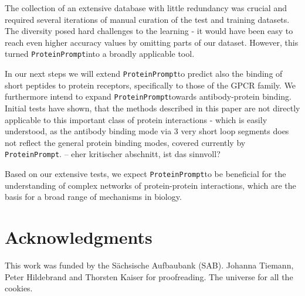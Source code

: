 \documentclass[preprint,3p,times,twocolumn]{elsarticle}
\newcommand{\TODO}[1] {\begingroup\color{red}#1\endgroup}
\newcommand{\toolblank}{\texttt{ProteinPrompt}}
\newcommand{\tool}{\toolblank\hspace{2pt}}
\begin{document}
The collection of an extensive database with little redundancy was crucial
and required several iterations of manual curation of the test and training datasets.
The diversity posed hard challenges to the learning
- it would have been easy to reach even higher accuracy values by omitting parts of our dataset.
However, this turned \tool into a broadly applicable tool.

In our next steps we will extend \tool to predict also the binding of short peptides to protein receptors, specifically to those of the GPCR family.
We furthermore intend to expand \tool towards antibody-protein binding.
Initial tests have shown, that the methods described in this paper are not directly applicable to this important class of protein interactions - which is easily understood, as the antibody binding mode via 3 very short loop segments does not reflect the general protein binding modes, covered currently by \toolblank. \TODO{ -- eher kritischer abschnitt, ist das sinnvoll?}

Based on our extensive tests, we expect
\tool to be beneficial for the understanding of complex networks of protein-protein interactions,
which are the basis for a broad range of mechanisms in biology.






\section*{Acknowledgments}

This work was funded by the S\"achsische Aufbaubank (SAB).
Johanna Tiemann, Peter Hildebrand and Thorsten Kaiser for proofreading.
The universe for all the cookies.




\end{document}

